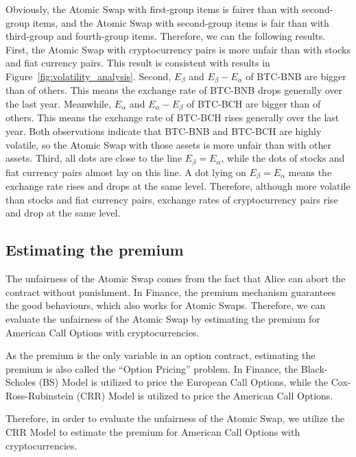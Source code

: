 Obviously, the Atomic Swap with first-group items is fairer than with second-group items, and the Atomic Swap with second-group items is fair than with third-group and fourth-group items.
Therefore, we can  the following results.
First, the Atomic Swap with cryptocurrency pairs is more unfair than with stocks and fiat currency pairs. This result is consistent with results in Figure~\ref{fig:volatility_analysis}.
Second, $E_\beta$ and $E_\beta - E_\alpha$ of BTC-BNB are bigger than of others. This means the exchange rate of BTC-BNB drops generally over the last year.
Meanwhile, $E_\alpha$ and $E_\alpha - E_\beta$ of BTC-BCH are bigger than of others. This means the exchange rate of BTC-BCH rises generally over the last year.
Both observations indicate that BTC-BNB and BTC-BCH are highly volatile, so the Atomic Swap with those assets is more unfair than with other assets.
Third, all dots are close to the line $E_\beta = E_\alpha$, while the dots of stocks and fiat currency pairs almost lay on this line.
A dot lying on $E_\beta = E_\alpha$ means the exchange rate rises and drops at the same level.
Therefore, although more volatile than stocks and fiat currency pairs, exchange rates of cryptocurrency pairs rise and drop at the same level.
















\subsection{Estimating the premium}

The unfairness of the Atomic Swap comes from the fact that Alice can abort the contract without punishment.
In Finance, the premium mechanism guarantees the good behaviours, which also works for Atomic Swaps.
Therefore, we can evaluate the unfairness of the Atomic Swap by estimating the premium for American Call Options with cryptocurrencies.

As the premium is the only variable in an option contract, estimating the premium is also called the ``Option Pricing'' problem.
In Finance, the Black-Scholes (BS) Model is utilized to price the European Call Options,
while the Cox-Ross-Rubinstein (CRR) Model is utilized to price the American Call Options.

Therefore, in order to evaluate the unfairness of the Atomic Swap, we utilize the CRR Model to estimate the premium for American Call Options with cryptocurrencies.

